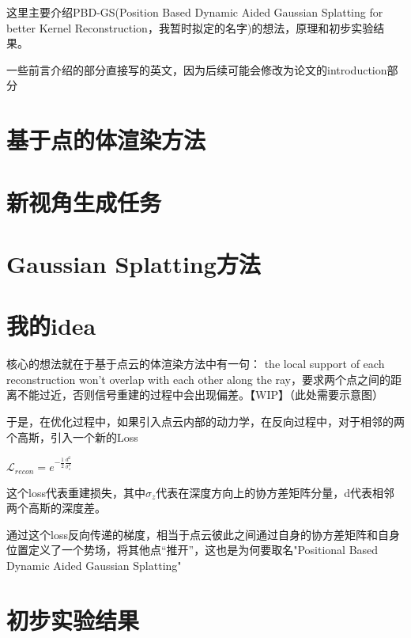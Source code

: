 这里主要介绍PBD-GS(Position Based Dynamic Aided Gaussian Splatting for better Kernel Reconstruction，我暂时拟定的名字)的想法，原理和初步实验结果。

一些前言介绍的部分直接写的英文，因为后续可能会修改为论文的introduction部分

\section{基于点的体渲染方法}


\section{新视角生成任务}



\section{Gaussian Splatting方法}


\section{我的idea}

核心的想法就在于基于点云的体渲染方法中有一句： the local support of each reconstruction won’t overlap with each other along the ray，要求两个点之间的距离不能过近，否则信号重建的过程中会出现偏差。【WIP】（此处需要示意图）

于是，在优化过程中，如果引入点云内部的动力学，在反向过程中，对于相邻的两个高斯，引入一个新的Loss

$\mathcal{L}_{recon} = e^{-\frac{1}{2}\frac{d^2}{\sigma_z^2}}$

这个loss代表重建损失，其中$\sigma_z$代表在深度方向上的协方差矩阵分量，d代表相邻两个高斯的深度差。

通过这个loss反向传递的梯度，相当于点云彼此之间通过自身的协方差矩阵和自身位置定义了一个势场，将其他点“推开”，这也是为何要取名"Positional Based Dynamic Aided Gaussian Splatting"

\section{初步实验结果}


